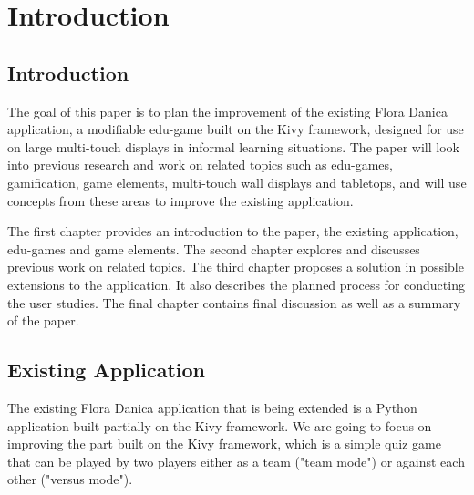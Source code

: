 
\chapter{Introduction}

\label{Chapter1}



\section{Introduction}

The goal of this paper is to plan the improvement of the existing Flora Danica application, a modifiable edu-game built on the Kivy framework\citep{Kivy}, designed for use on large multi-touch displays in informal learning situations. The paper will look into previous research and work on related topics such as edu-games, gamification, game elements, multi-touch wall displays and tabletops, and will use concepts from these areas to improve the existing application.

The first chapter provides an introduction to the paper, the existing application, edu-games and game elements. The second chapter explores and discusses previous work on related topics. The third chapter proposes a solution in possible extensions to the application. It also describes the planned process for conducting the user studies. The final chapter contains final discussion as well as a summary of the paper.


\section{Existing Application}

The existing Flora Danica application that is being extended is a Python application built partially on the Kivy framework\citep{Kivy}. We are going to focus on improving the part built on the Kivy framework, which is a simple quiz game that can be played by two players either as a team ("team mode") or against each other ("versus mode").

